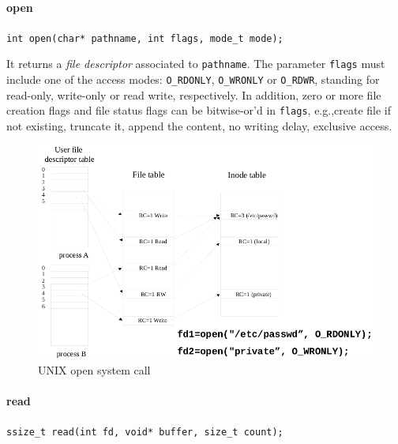 \paragraph{open}
\texttt{int open(char* pathname, int flags, mode\_t mode);}

It returns a \emph{file descriptor} associated to \texttt{pathname}. The parameter \texttt{flags} must include one of the access modes: \texttt{O\_RDONLY}, \texttt{O\_WRONLY} or \texttt{O\_RDWR}, standing for read-only, write-only or read write, respectively. In addition, zero or more file creation flags and file status flags can be bitwise-or'd in \texttt{flags}, e.g.,\@ create file if not existing, truncate it, append the content, no writing delay, exclusive access.

\begin{figure}[hbtp]
\centering
\includegraphics[scale=0.3]{images/file_system/open_system_call.jpg}
\caption{UNIX open system call}
\end{figure}

\paragraph{read}
\texttt{ssize\_t read(int fd, void* buffer, size\_t count);}

